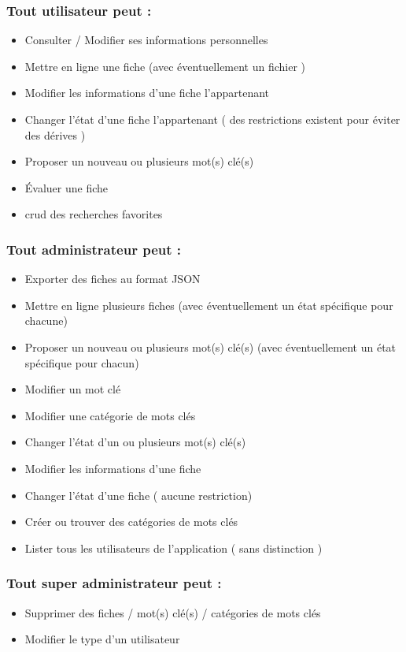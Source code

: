 \subsubsection*{Tout utilisateur peut : }
\begin{itemize}
    \item Consulter / Modifier ses informations personnelles
    \item Mettre en ligne une fiche (avec éventuellement un fichier )
    \item Modifier les informations d'une fiche l'appartenant
    \item Changer l'état d'une fiche l'appartenant ( des restrictions existent pour éviter des dérives )
    \item Proposer un nouveau ou plusieurs mot(s) clé(s)
    \item Évaluer une fiche 
    \item \Gls{crud} des recherches favorites
\end{itemize}

\subsubsection*{Tout administrateur peut : }
\begin{itemize}
    \item Exporter des fiches au format JSON
    \item Mettre en ligne plusieurs fiches (avec éventuellement un état spécifique pour chacune)
    \item Proposer un nouveau ou plusieurs mot(s) clé(s) (avec éventuellement un état spécifique pour chacun)
    \item Modifier un mot clé
    \item Modifier une catégorie de mots clés
    \item Changer l'état d'un ou plusieurs mot(s) clé(s)
    \item Modifier les informations d'une fiche
    \item Changer l'état d'une fiche ( aucune restriction)
    \item Créer ou trouver des catégories de mots clés
    \item Lister tous les utilisateurs de l'application ( sans distinction )
\end{itemize}

\subsubsection*{Tout super administrateur peut : }
\begin{itemize}
    \item Supprimer des fiches / mot(s) clé(s) / catégories de mots clés
    \item Modifier le type d'un utilisateur
\end{itemize}
\pagebreak
